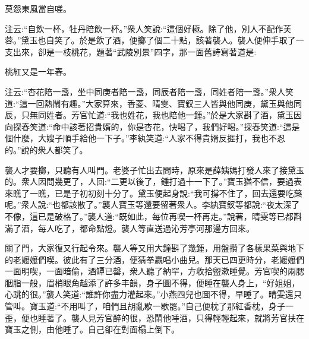 \begin{poem}
    \begin{pl}莫怨東風當自嗟。\end{pl}
\end{poem}


\begin{parag}
    注云:“自飲一杯，牡丹陪飲一杯。”衆人笑說:“這個好極。除了他，別人不配作芙蓉。”黛玉也自笑了。於是飲了酒，便擲了個二十點，該著襲人。襲人便伸手取了一支出來，卻是一枝桃花，題著“武陵別景”四字，那一面舊詩寫著道是:
\end{parag}


\begin{poem}
    \begin{pl}桃紅又是一年春。\end{pl}
\end{poem}


\begin{parag}
    注云:“杏花陪一盞，坐中同庚者陪一盞，同辰者陪一盞，同姓者陪一盞。”衆人笑道:“這一回熱鬧有趣。”大家算來，香菱、晴雯、寶釵三人皆與他同庚，黛玉與他同辰，只無同姓者。芳官忙道:“我也姓花，我也陪他一鍾。”於是大家斟了酒，黛玉因向探春笑道:“命中該著招貴婿的，你是杏花，快喝了，我們好喝。”探春笑道:“這是個什麼，大嫂子順手給他一下子。”李紈笑道:“人家不得貴婿反捱打，我也不忍的。”說的衆人都笑了。
\end{parag}


\begin{parag}
    襲人才要擲，只聽有人叫門。老婆子忙出去問時，原來是薛姨媽打發人來了接黛玉的。衆人因問幾更了，人回:“二更以後了，鍾打過十一下了。”寶玉猶不信，要過表來瞧了一瞧，已是子初初刻十分了。黛玉便起身說:“我可撐不住了，回去還要吃藥呢。”衆人說:“也都該散了。”襲人寶玉等還要留著衆人。李紈寶釵等都說:“夜太深了不像，這已是破格了。”襲人道:“既如此，每位再喫一杯再走。”說著，晴雯等已都斟滿了酒，每人吃了，都命點燈。襲人等直送過沁芳亭河那邊方回來。
\end{parag}


\begin{parag}
    關了門，大家復又行起令來。襲人等又用大鐘斟了幾鍾，用盤攢了各樣果菜與地下的老嬤嬤們喫。彼此有了三分酒，便猜拳贏唱小曲兒。那天已四更時分，老嬤嬤們一面明喫，一面暗偷，酒罈已罄，衆人聽了納罕，方收拾盥漱睡覺。芳官喫的兩腮胭脂一般，眉梢眼角越添了許多丰韻，身子圖不得，便睡在襲人身上，“好姐姐，心跳的很。”襲人笑道:“誰許你盡力灌起來。”小燕四兒也圖不得，早睡了。晴雯還只管叫。寶玉道:“不用叫了，咱們且胡亂歇一歇罷。”自己便枕了那紅香枕，身子一歪，便也睡著了。襲人見芳官醉的很，恐鬧他唾酒，只得輕輕起來，就將芳官扶在寶玉之側，由他睡了。自己卻在對面榻上倒下。
\end{parag}


